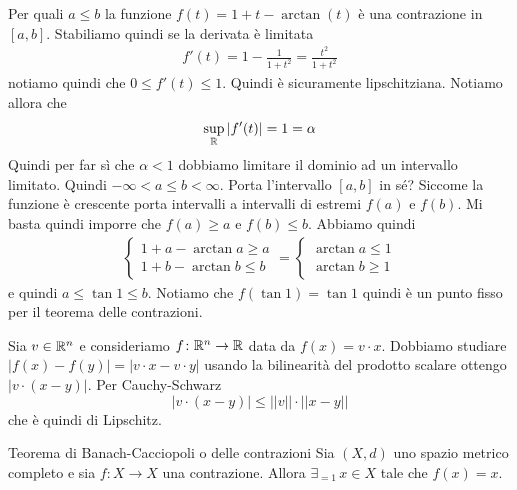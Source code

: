 \documentclass[a4paper]{article}
\begin{document}
\begin{snippetexercise}{}
    Per quali \(a \leq b\) la funzione \(f(t) = 1 + t - \arctan(t)\)
    è una contrazione in \([a,b]\).
    Stabiliamo quindi se la derivata è limitata
    \begin{align*}
        f'(t) = 1 - \frac{1}{1 + t^2} = \frac{t^2}{1 + t^2}
    \end{align*}
    notiamo quindi che \(0 \leq f'(t) \leq 1\). Quindi è sicuramente lipschitziana.
    Notiamo allora che
    \[
        \sup_{\mathbb{R}} |f'(t)| = 1 = \alpha
    \]
    Quindi per far sì che \(\alpha < 1\) dobbiamo limitare il dominio ad un intervallo limitato.
    Quindi \(-\infty < a \leq b < \infty\).
    Porta l'intervallo \([a,b]\) in sé?
    Siccome la funzione è crescente porta intervalli a intervalli
    di estremi \(f(a)\) e \(f(b)\). Mi basta quindi imporre
    che \(f(a) \geq a\) e \(f(b) \leq b\). Abbiamo quindi
    \begin{align*}
        \begin{cases}
            1 + a - \arctan a \geq a \\
            1 + b - \arctan b \leq b
        \end{cases}
        =
        \begin{cases}
            \arctan a \leq 1 \\
            \arctan b \geq 1
        \end{cases}
    \end{align*}
    e quindi \(a \leq \tan 1 \leq b\).
    Notiamo che \(f(\tan 1) = \tan 1\) quindi è un punto fisso
    per il teorema delle contrazioni.
\end{snippetexercise}

\begin{snippetexample}{}
    Sia \(v \in \mathbb{R}^n\) e consideriamo
    \(f\colon \mathbb{R}^n \to \mathbb{R}\) data da
    \(f(x) = v \cdot x\).
    Dobbiamo studiare \(|f(x) - f(y)| = |v\cdot x - v \cdot y|\)
    usando la bilinearità del prodotto scalare ottengo
    \(|v\cdot (x-y)|\). Per Cauchy-Schwarz
    \[
        |v\cdot (x-y)| \leq ||v|| \cdot ||x-y||
    \]
    che è quindi di Lipschitz.
\end{snippetexample}

\begin{snippettheorem}{Teorema di Banach-Cacciopoli o delle contrazioni}
    Sia \((X, d)\) uno spazio metrico completo
    e sia \(f \colon X \to X\) una contrazione.
    Allora \(\exists_{=1}\, x \in X\) tale che \(f(x) = x\).
\end{snippettheorem}
\end{document}
